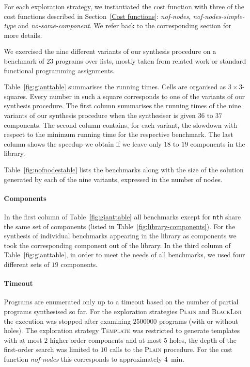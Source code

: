 For each exploration strategy, we instantiated the cost function with three of the cost functions described in Section~\ref{Cost functions}: \textit{nof-nodes}, \textit{nof-nodes-simple-type} and \textit{no-same-component}. We refer back to the corresponding section for more details.

We exercised the nine different variants of our synthesis procedure on a benchmark of $23$ programs over lists, mostly taken from related work or standard functional programming assignments.

Table~\ref{fig:gianttable} summarises the running times. Cells are organised as $3 \times 3$-squares. Every number in such a square corresponds to one of the variants of our synthesis procedure.
The first column summarises the running times of the nine variants of our synthesis procedure when the synthesiser is given $36$ to $37$ components.
The second column contains, for each variant, the slowdown with respect to the minimum running time for the respective benchmark.
The last column shows the speedup we obtain if we leave only $18$ to $19$ components in the library.

Table~\ref{fig:nofnodestable} lists the benchmarks along with the size of the solution generated by each of the nine variants, expressed in the number of nodes.

\paragraph{Components} In the first column of Table~\ref{fig:gianttable} all benchmarks except for \lstinline?nth? share the same set of components (listed in Table~\ref{fig:library-components}). For the synthesis of individual benchmarks appearing in the library as components we took the corresponding component out of the library.
In the third column of Table~\ref{fig:gianttable}, in order to meet the needs of all benchmarks, we used four different sets of $19$ components.

\paragraph{Timeout} Programs are enumerated only up to a timeout based on the number of partial programs synthesised so far. For the exploration strategies \textsc{Plain} and \textsc{BlackList} the execution was stopped after examining $2500000$ programs (with or without holes). The exploration strategy \textsc{Template} was restricted to generate templates with at most $2$ higher-order components and at most $5$ holes, the depth of the first-order search was limited to $10$ calls to the \textsc{Plain} procedure. For the cost function \textit{nof-nodes} this corresponds to approximately \SI{4}{min}.

